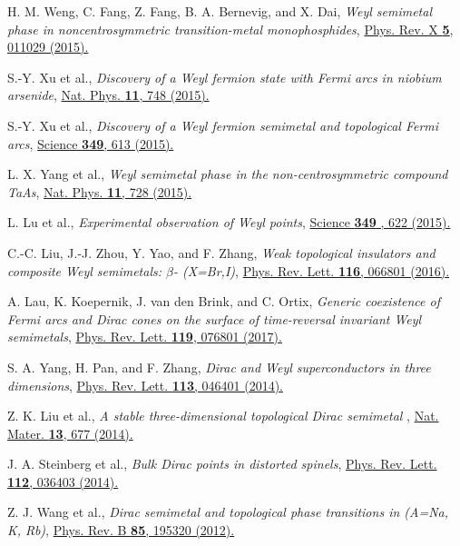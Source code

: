 \documentclass[aps,prl,floatfix,twocolumn,reprint]{revtex4}
\begin{document}
\begin{thebibliography}{99}
 H. M. Weng, C. Fang, Z. Fang, B. A. Bernevig, and X. Dai,
\textit{Weyl semimetal phase in noncentrosymmetric transition-metal
monophosphides}, \href{https://doi.org/10.1103/PhysRevX.5.011029}{Phys. Rev.
X \textbf{5}, 011029 (2015).}

 S.-Y. Xu et al., \textit{Discovery of a Weyl fermion state
with Fermi arcs in niobium arsenide}, \href{https://doi.org/10.1038/nphys3437}%
{Nat. Phys. \textbf{11}, 748 (2015).}

 S.-Y. Xu et al., \textit{Discovery of a Weyl fermion
semimetal and topological Fermi arcs}, \href{https://doi.org/10.1126/science.aaa9297}%
{Science \textbf{349}, 613 (2015).}

 L. X. Yang et al., \textit{Weyl semimetal phase in the
non-centrosymmetric compound TaAs}, \href{https://doi.org/10.1038/nphys3425}{%
Nat. Phys. \textbf{11}, 728 (2015).}

 L. Lu et al., \textit{Experimental observation of Weyl
points}, \href{https://doi.org/10.1126/science.aaa9273}{Science \textbf{349}%
, 622 (2015).}

 C.-C. Liu, J.-J. Zhou, Y. Yao, and F. Zhang, \textit{Weak
topological insulators and composite Weyl semimetals: $\beta$-
(X=Br,I)}, \href{https://doi.org/10.1103/PhysRevLett.116.066801}{Phys. Rev.
Lett. \textbf{116}, 066801 (2016).}

 A. Lau, K. Koepernik, J. van den Brink, and C. Ortix,
\textit{Generic coexistence of Fermi arcs and Dirac cones on the surface of
time-reversal invariant Weyl semimetals}, \href{https://doi.org/10.1103/PhysRevLett.119.076801}%
{Phys. Rev. Lett. \textbf{119}, 076801 (2017).}

 S. A. Yang, H. Pan, and F. Zhang, \textit{Dirac and Weyl
superconductors in three dimensions}, \href{https://doi.org/10.1103/PhysRevLett.113.046401}%
{Phys. Rev. Lett. \textbf{113}, 046401 (2014).}

 Z. K. Liu et al., \textit{A stable three-dimensional
topological Dirac semimetal }, \href{https://doi.org/10.1038/nmat3990}%
{Nat. Mater. \textbf{13}, 677 (2014).}

 J. A. Steinberg et al., \textit{Bulk Dirac points in
distorted spinels}, \href{https://doi.org/10.1103/PhysRevLett.112.036403}{%
Phys. Rev. Lett. \textbf{112}, 036403 (2014).}

 Z. J. Wang et al., \textit{Dirac semimetal and topological
phase transitions in  (A=Na, K, Rb)}, \href{https://doi.org/10.1103/PhysRevB.85.195320}%
{Phys. Rev. B \textbf{85}, 195320 (2012).}


\end{thebibliography}
\end{document}
